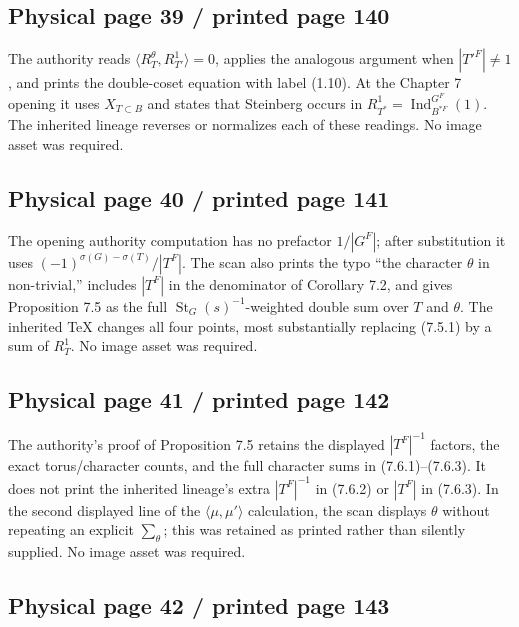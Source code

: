 \documentclass[10pt]{article}
\begin{document}
\subsection*{Physical page 39 / printed page 140}

The authority reads \(\langle R_T^\theta,R_{T'}^1\rangle=0\), applies the analogous argument when \(|T'^F|\ne1\), and prints the double-coset equation with label (1.10). At the Chapter 7 opening it uses \(X_{T\subset B}\) and states that Steinberg occurs in \(R_{T^*}^1=\operatorname{Ind}_{B^{*F}}^{G^F}(1)\). The inherited lineage reverses or normalizes each of these readings. No image asset was required.\par

\subsection*{Physical page 40 / printed page 141}

The opening authority computation has no prefactor \(1/|G^F|\); after substitution it uses \((-1)^{\sigma(G)-\sigma(T)}/|T^F|\). The scan also prints the typo “the character \(\theta\) in non-trivial,” includes \(|T^F|\) in the denominator of Corollary 7.2, and gives Proposition 7.5 as the full \(\operatorname{St}_G(s)^{-1}\)-weighted double sum over \(T\) and \(\theta\). The inherited TeX changes all four points, most substantially replacing (7.5.1) by a sum of \(R_T^1\). No image asset was required.\par

\subsection*{Physical page 41 / printed page 142}

The authority's proof of Proposition 7.5 retains the displayed \(|T^F|^{-1}\) factors, the exact torus/character counts, and the full character sums in (7.6.1)--(7.6.3). It does not print the inherited lineage's extra \(|T^F|^{-1}\) in (7.6.2) or \(|T^F|\) in (7.6.3). In the second displayed line of the \(\langle\mu,\mu'\rangle\) calculation, the scan displays \(\theta\) without repeating an explicit \(\sum_\theta\); this was retained as printed rather than silently supplied. No image asset was required.\par

\subsection*{Physical page 42 / printed page 143}
\end{document}
